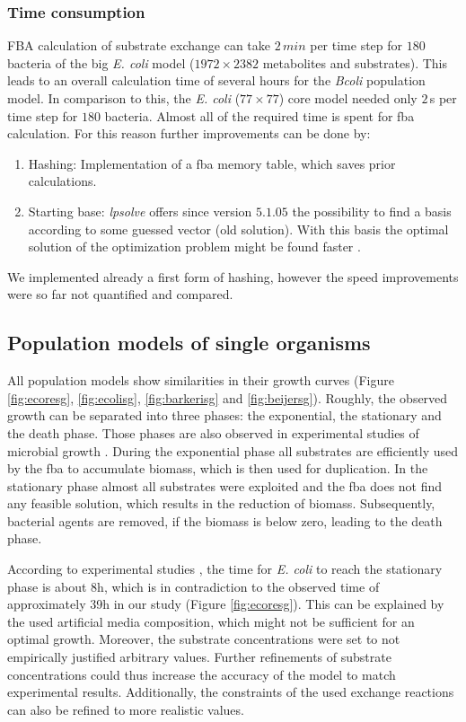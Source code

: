 \subsubsection{Time consumption}
FBA calculation of substrate exchange can take $2\,min$ per time step for $180$ bacteria of the big \textit{E. coli} model ($1972\times 2382$ metabolites and substrates).
This leads to an overall calculation time of several hours for the \textit{Bcoli} population model.
In comparison to this, the \textit{E. coli} ($77\times 77$) core model needed only $2\,$s per time step for $180$ bacteria.
Almost all of the required time is spent for fba calculation.
For this reason further improvements can be done by:
\begin{enumerate}
  \item Hashing: Implementation of a fba memory table, which saves prior calculations.
  \item Starting base: \textit{lpsolve} offers since version $5.1.05$ the possibility to find a basis according to some guessed vector (old solution).
    With this basis the optimal solution of the optimization problem might be found faster \cite{warmstart}.
\end{enumerate}
We implemented already a first form of hashing, however the speed improvements were so far not quantified and compared. 

\subsection{Population models of single organisms}
All population models show similarities in their growth curves (Figure \hyperref[fig:ecoresg]{\ref{fig:ecoresg}}, \hyperref[fig:ecolisg]{\ref{fig:ecolisg}}, \hyperref[fig:barkerisg]{\ref{fig:barkerisg}} and \hyperref[fig:beijersg]{\ref{fig:beijersg}}).
Roughly, the observed growth can be separated into three phases: the exponential, the stationary and the death phase. Those phases are also observed in experimental studies of microbial growth \cite{Varma1994}.
During the exponential phase all substrates are efficiently used by the fba to accumulate biomass, which is then used for duplication. In the stationary phase almost all substrates were exploited and the fba does not find any feasible solution, which results in the reduction of biomass. Subsequently, bacterial agents are removed, if the biomass is below zero, leading to the death phase.

According to experimental studies \cite{Varma1994}, the time for \emph{E. coli} to reach the stationary phase is about 8\;h, which is in contradiction to the observed time of approximately 39\;h in our study (Figure \hyperref[fig:ecoresg]{\ref{fig:ecoresg}}). This can be explained by the used artificial media composition, which might not be sufficient for an optimal growth.
Moreover, the substrate concentrations were set to not empirically justified arbitrary values. Further refinements of substrate concentrations could thus increase the accuracy of the model to match experimental results. Additionally, the constraints of the used exchange reactions can also be refined to more realistic values.

